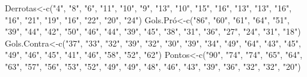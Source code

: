 \documentclass[
]{book}
\newenvironment{Shaded}{\begin{snugshade}}{\end{snugshade}}
\newcommand{\FunctionTok}[1]{\textcolor[rgb]{0.00,0.00,0.00}{#1}}
\newcommand{\NormalTok}[1]{#1}
\newcommand{\OtherTok}[1]{\textcolor[rgb]{0.56,0.35,0.01}{#1}}
\newcommand{\StringTok}[1]{\textcolor[rgb]{0.31,0.60,0.02}{#1}}
\begin{document}
\begin{Shaded}
\begin{Highlighting}[]
\NormalTok{Derrotas}\OtherTok{\textless{}{-}}\FunctionTok{c}\NormalTok{(}\StringTok{"4"}\NormalTok{,    }\StringTok{"8"}\NormalTok{,    }\StringTok{"6"}\NormalTok{,    }\StringTok{"11"}\NormalTok{,   }\StringTok{"10"}\NormalTok{,   }\StringTok{"9"}\NormalTok{,    }\StringTok{"13"}\NormalTok{,   }\StringTok{"10"}\NormalTok{,   }\StringTok{"15"}\NormalTok{,   }\StringTok{"16"}\NormalTok{,   }\StringTok{"13"}\NormalTok{,   }\StringTok{"13"}\NormalTok{,   }\StringTok{"16"}\NormalTok{,   }\StringTok{"16"}\NormalTok{,   }\StringTok{"21"}\NormalTok{,   }\StringTok{"19"}\NormalTok{,   }\StringTok{"16"}\NormalTok{,   }\StringTok{"22"}\NormalTok{,   }\StringTok{"20"}\NormalTok{,   }\StringTok{"24"}\NormalTok{)}
\NormalTok{Gols.Pró}\OtherTok{\textless{}{-}}\FunctionTok{c}\NormalTok{(}\StringTok{"86"}\NormalTok{,   }\StringTok{"60"}\NormalTok{,   }\StringTok{"61"}\NormalTok{,   }\StringTok{"64"}\NormalTok{,   }\StringTok{"51"}\NormalTok{,   }\StringTok{"39"}\NormalTok{,   }\StringTok{"44"}\NormalTok{,   }\StringTok{"42"}\NormalTok{,   }\StringTok{"50"}\NormalTok{,   }\StringTok{"46"}\NormalTok{,   }\StringTok{"44"}\NormalTok{,   }\StringTok{"39"}\NormalTok{,   }\StringTok{"45"}\NormalTok{,   }\StringTok{"38"}\NormalTok{,   }\StringTok{"31"}\NormalTok{,   }\StringTok{"36"}\NormalTok{,   }\StringTok{"27"}\NormalTok{,   }\StringTok{"24"}\NormalTok{,   }\StringTok{"31"}\NormalTok{,   }\StringTok{"18"}\NormalTok{)}
\NormalTok{Gols.Contra}\OtherTok{\textless{}{-}}\FunctionTok{c}\NormalTok{(}\StringTok{"37"}\NormalTok{,    }\StringTok{"33"}\NormalTok{,   }\StringTok{"32"}\NormalTok{,   }\StringTok{"39"}\NormalTok{,   }\StringTok{"32"}\NormalTok{,   }\StringTok{"30"}\NormalTok{,   }\StringTok{"39"}\NormalTok{,   }\StringTok{"34"}\NormalTok{,   }\StringTok{"49"}\NormalTok{,   }\StringTok{"64"}\NormalTok{,   }\StringTok{"43"}\NormalTok{,   }\StringTok{"45"}\NormalTok{,   }\StringTok{"49"}\NormalTok{,   }\StringTok{"46"}\NormalTok{,   }\StringTok{"45"}\NormalTok{,   }\StringTok{"41"}\NormalTok{,   }\StringTok{"46"}\NormalTok{,   }\StringTok{"58"}\NormalTok{,   }\StringTok{"52"}\NormalTok{,   }\StringTok{"62"}\NormalTok{)}
\NormalTok{Pontos}\OtherTok{\textless{}{-}}\FunctionTok{c}\NormalTok{(}\StringTok{"90"}\NormalTok{, }\StringTok{"74"}\NormalTok{,   }\StringTok{"74"}\NormalTok{,   }\StringTok{"65"}\NormalTok{,   }\StringTok{"64"}\NormalTok{,   }\StringTok{"63"}\NormalTok{,   }\StringTok{"57"}\NormalTok{,   }\StringTok{"56"}\NormalTok{,   }\StringTok{"53"}\NormalTok{,   }\StringTok{"52"}\NormalTok{,   }\StringTok{"49"}\NormalTok{,   }\StringTok{"49"}\NormalTok{,   }\StringTok{"48"}\NormalTok{,   }\StringTok{"46"}\NormalTok{,   }\StringTok{"43"}\NormalTok{,   }\StringTok{"39"}\NormalTok{,   }\StringTok{"36"}\NormalTok{,   }\StringTok{"32"}\NormalTok{,   }\StringTok{"32"}\NormalTok{,   }\StringTok{"20"}\NormalTok{)}

\end{Highlighting}
\end{Shaded}
\end{document}
